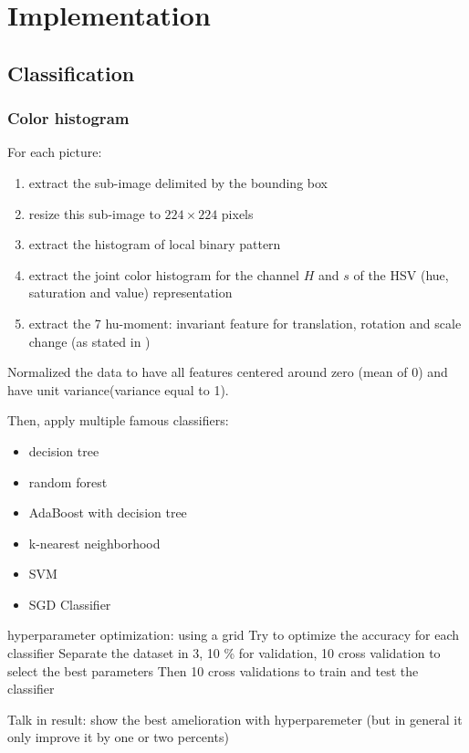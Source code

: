 \chapter{Implementation}
\section{Classification}
\subsection{Color histogram}

For each picture:
\begin{enumerate}
    \item extract the sub-image delimited by the bounding box
    \item resize this sub-image to $224 \times 224$ pixels
    \item extract the histogram of local binary pattern
    \item extract the joint color histogram for the channel $H$ and $s$ of the HSV (hue, saturation and value) representation
    \item extract the 7 hu-moment: invariant feature for translation, rotation and scale change (as stated in \cite{Hu1962})
\end{enumerate}

Normalized the data to have all features centered around zero (mean of 0) and have unit variance(variance equal to 1).

Then, apply multiple famous classifiers:
\begin{itemize}
    \item decision tree
    \item random forest
    \item AdaBoost with decision tree
    \item k-nearest neighborhood
    \item SVM
    \item SGD Classifier
\end{itemize}

hyperparameter optimization: using a grid
Try to optimize the accuracy for each classifier
Separate the dataset in 3, 10 \% for validation, 10 cross validation to select the best parameters
Then 10 cross validations to train and test the classifier

Talk in result: show the best amelioration with hyperparemeter (but in general it only improve it by one or two percents)

